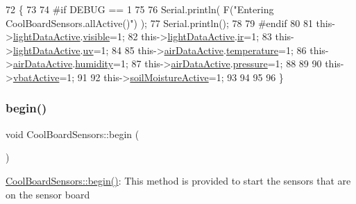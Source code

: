 \begin{DoxyCode}
72 \{
73 
74 \textcolor{preprocessor}{#if DEBUG == 1 }
75 
76     Serial.println( F(\textcolor{stringliteral}{"Entering CoolBoardSensors.allActive()"}) );
77     Serial.println();
78 
79 \textcolor{preprocessor}{#endif}
80     
81     this->\hyperlink{class_cool_board_sensors_ac4deb1cf41bac8b91c780c92fab00ba4}{lightDataActive}.\hyperlink{struct_cool_board_sensors_1_1light_active_a9c351100969d0dc055ad2e6712cc7ac8}{visible}=1;
82     this->\hyperlink{class_cool_board_sensors_ac4deb1cf41bac8b91c780c92fab00ba4}{lightDataActive}.\hyperlink{struct_cool_board_sensors_1_1light_active_a4c21258d3c89c6292740d6deb10f9dcc}{ir}=1;
83     this->\hyperlink{class_cool_board_sensors_ac4deb1cf41bac8b91c780c92fab00ba4}{lightDataActive}.\hyperlink{struct_cool_board_sensors_1_1light_active_a0e6cfc311425a31f32c32fc3b834ffb8}{uv}=1;    
84 
85     this->\hyperlink{class_cool_board_sensors_abff8dfeccb2f7689847bb64d5f1cd31e}{airDataActive}.\hyperlink{struct_cool_board_sensors_1_1air_active_ac08576736c7ac3bfbfec32e5ee17c686}{temperature}=1;
86     this->\hyperlink{class_cool_board_sensors_abff8dfeccb2f7689847bb64d5f1cd31e}{airDataActive}.\hyperlink{struct_cool_board_sensors_1_1air_active_ab69738e9fd1c2ba80dc666bcd1e116f7}{humidity}=1;
87     this->\hyperlink{class_cool_board_sensors_abff8dfeccb2f7689847bb64d5f1cd31e}{airDataActive}.\hyperlink{struct_cool_board_sensors_1_1air_active_a15932ccfb6ee6603713d937ec9b76b72}{pressure}=1;
88 
89 
90     this->\hyperlink{class_cool_board_sensors_ab0b4bbae83796b52b90f91008d383583}{vbatActive}=1;
91 
92     this->\hyperlink{class_cool_board_sensors_ae7971bf527781ac4994309591b78ab89}{soilMoistureActive}=1;
93     
94 
95 
96 \}
\end{DoxyCode}
\mbox{\label{class_cool_board_sensors_a97095823ef7c8f5290812f1405b966b3}} 
\subsubsection{\texorpdfstring{begin()}{begin()}}
{\footnotesize\ttfamily void Cool\+Board\+Sensors\+::begin (\begin{DoxyParamCaption}{ }\end{DoxyParamCaption})}

\hyperlink{class_cool_board_sensors_a97095823ef7c8f5290812f1405b966b3}{Cool\+Board\+Sensors\+::begin()}\+: This method is provided to start the sensors that are on the sensor board 

